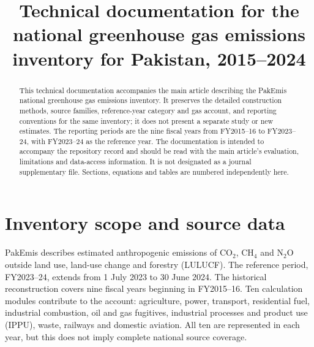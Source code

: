 \documentclass[essd]{copernicus}
\begin{document}
\title{Technical documentation for the national greenhouse gas emissions inventory for Pakistan, 2015--2024}
\received{}
\pubdiscuss{}
\revised{}
\accepted{}
\published{}
\maketitle


\ReleaseCover
\begin{abstract}
This technical documentation accompanies the main article describing the PakEmis national greenhouse gas emissions inventory. It preserves the detailed construction methods, source families, reference-year category and gas account, and reporting conventions for the same inventory; it does not present a separate study or new estimates. The reporting periods are the nine fiscal years from FY2015--16 to FY2023--24, with FY2023--24 as the reference year. The documentation is intended to accompany the repository record and should be read with the main article's evaluation, limitations and data-access information. It is not designated as a journal supplementary file. Sections, equations and tables are numbered independently here.
\end{abstract}

\section{Inventory scope and source data}
\label{sec:scope}

PakEmis describes estimated anthropogenic emissions of CO$_2$, CH$_4$ and N$_2$O outside land use, land-use change and forestry (LULUCF). The reference period, FY2023--24, extends from 1 July 2023 to 30 June 2024. The historical reconstruction covers nine fiscal years beginning in FY2015--16. Ten calculation modules contribute to the account: agriculture, power, transport, residential fuel, industrial combustion, oil and gas fugitives, industrial processes and product use (IPPU), waste, railways and domestic aviation. All ten are represented in each year, but this does not imply complete national source coverage.
\end{document}
